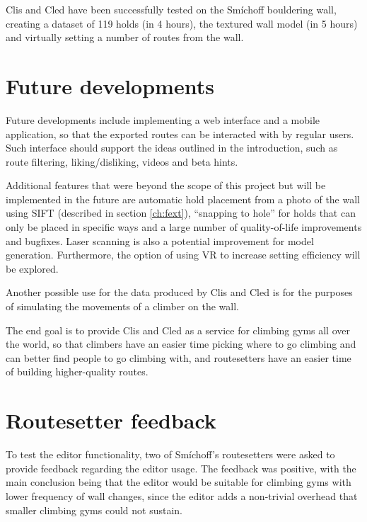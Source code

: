 \label{sec:conclusion}
Clis and Cled have been successfully tested on the Smíchoff bouldering wall, creating a dataset of 119 holds (in 4 hours), the textured wall model (in 5 hours) and virtually setting a number of routes from the wall.

\setcounter{secnumdepth}{0}

\section{Future developments}
Future developments include implementing a web interface and a mobile application, so that the exported routes can be interacted with by regular users.
Such interface should support the ideas outlined in the introduction, such as route filtering, liking/disliking, videos and beta hints.

Additional features that were beyond the scope of this project but will be implemented in the future are automatic hold placement from a photo of the wall using SIFT (described in section \ref{ch:fext}), ``snapping to hole'' for holds that can only be placed in specific ways and a large number of quality-of-life improvements and bugfixes.
Laser scanning is also a potential improvement for model generation.
Furthermore, the option of using VR to increase setting efficiency will be explored.

Another possible use for the data produced by Clis and Cled is for the purposes of simulating the movements of a climber on the wall.

The end goal is to provide Clis and Cled as a service for climbing gyms all over the world, so that climbers have an easier time picking where to go climbing and can better find people to go climbing with, and routesetters have an easier time of building higher-quality routes.

\section{Routesetter feedback}
To test the editor functionality, two of Smíchoff's routesetters were asked to provide feedback regarding the editor usage.
The feedback was positive, with the main conclusion being that the editor would be suitable for climbing gyms with lower frequency of wall changes, since the editor adds a non-trivial overhead that smaller climbing gyms could not sustain.

\setcounter{secnumdepth}{3}
